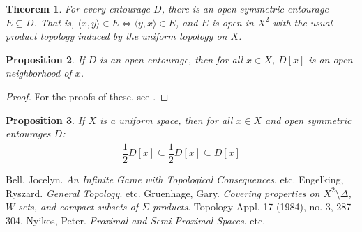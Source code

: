 \documentclass{amsart}
\newtheorem{thm}{Theorem}[section]
\newtheorem{prop}[thm]{Proposition}
\theoremstyle{definition}
\theoremstyle{remark}
\newcommand{\<}{\langle}
\renewcommand{\>}{\rangle}
\newcommand{\cl}[1]{\overline{#1}}
\begin{document}
\begin{thm}
  For every entourage $D$, there is an open symmetric entourage $E\subseteq D$. That is, $\<x,y\>\in E \Leftrightarrow \<y,x\> \in E$, and $E$ is open in $X^2$ with the usual product topology induced by the uniform topology on $X$.
\end{thm}

\begin{prop}
  If $D$ is an open entourage, then for all $x\in X$, $D[x]$ is an open neighborhood of $x$.
\end{prop}

\begin{proof}
  For the proofs of these, see \cite{e}.
\end{proof}

\begin{prop}
  If $X$ is a uniform space, then for all $x\in X$ and open symmetric entourages $D$:
    \[
      \frac{1}{2}D[x]\subseteq \cl{\frac{1}{2}D[x]}\subseteq D[x]
    \]
\end{prop}


\begin{thebibliography}{99}
  Bell, Jocelyn.
  \emph{An Infinite Game with Topological Consequences}.
  etc.
  Engelking, Ryszard.
  \emph{General Topology}.
  etc.
  Gruenhage, Gary.
  \emph{Covering properties on $X^2\setminus\Delta$, $W$-sets, and compact subsets of $\Sigma$-products}. 
  Topology Appl. 17 (1984), no. 3, 287–304. 
  Nyikos, Peter.
  \emph{Proximal and Semi-Proximal Spaces}.
  etc.
\end{thebibliography}
\end{document}
